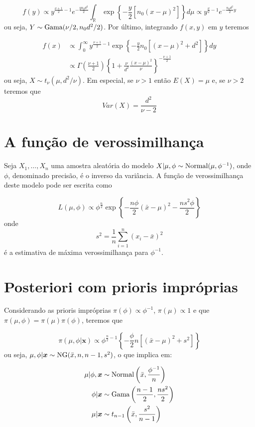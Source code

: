 \documentclass[
  letterpaper,
  DIV=11,
  numbers=noendperiod]{scrreprt}
\theoremstyle{definition}
\theoremstyle{definition}
\theoremstyle{remark}
\begin{document}
\[f(y)\propto y^{\frac{\nu+1}{2}-1}e^{-\frac{yn_0d^2}{2}}\int_{\mathbb{R}}\exp\left\{-\frac{y}{2}\left[n_0(x-\mu)^2\right]\right\}d\mu\propto y^{\frac{\nu}{2}-1}e^{-\frac{n_0d^2}{2}y}\]
ou seja, \(Y\sim\hbox{Gama}(\nu/2, n_0d^2/2)\). Por último, integrando
\(f(x,y)\) em \(y\) teremos

\[\begin{align}f(x)&\propto \int_0^\infty y^{\frac{\nu+1}{2}-1}\exp\left\{-\frac{y}{2}n_0\left[(x-\mu)^2 + d^2\right]\right\}dy \\&\propto \Gamma\left(\frac{\nu+1}{2}\right)\left\{1+\frac{\nu}{d^2}\frac{(x-\mu)^2}{\nu}\right\}^{-\frac{\nu+1}{2}}\end{align}\]
ou seja, \(X\sim t_{\nu}(\mu, d^2/\nu)\). Em especial, se \(\nu>1\)
então \(E(X)=\mu\) e, se \(\nu>2\) teremos que
\[Var(X)=\frac{d^2}{\nu-2}\]

\hypertarget{a-funuxe7uxe3o-de-verossimilhanuxe7a-1}{%
\section{A função de
verossimilhança}\label{a-funuxe7uxe3o-de-verossimilhanuxe7a-1}}

Seja \(X_1,\ldots,X_n\) uma amostra aleatória do modelo
\(X|\mu,\phi\sim\hbox{Normal}(\mu,\phi^{-1})\), onde \(\phi\),
denominado precisão, é o inverso da variância. A função de
verossimilhança deste modelo pode ser escrita como

\[L(\mu,\phi)\propto \phi^{\frac{n}{2}}\exp\left\{-\frac{n\phi}{2}(\bar{x}-\mu)^2 -\frac{ns^2\phi}{2}\right\}\]
onde \[s^2=\frac{1}{n}\sum_{i=1}^n(x_i-\bar{x})^2\] é a estimativa de
máxima verossimilhança para \(\phi^{-1}\).

\hypertarget{posteriori-com-prioris-impruxf3prias}{%
\section{Posteriori com prioris
impróprias}\label{posteriori-com-prioris-impruxf3prias}}

Considerando as prioris impróprias \(\pi(\phi)\propto \phi^{-1}\),
\(\pi(\mu)\propto 1\) e que \(\pi(\mu,\phi)=\pi(\mu)\pi(\phi)\), teremos
que

\[\pi(\mu,\phi|\boldsymbol{x})\propto \phi^{\frac{n}{2}-1}\left\{-\frac{\phi}{2}n\left[ (\bar{x}-\mu)^2 +s^2\right]\right\}\]
ou seja, \(\mu,\phi|\boldsymbol{x}\sim\hbox{NG}(\bar{x},n,n-1,s^2)\), o
que implica em:

\[\begin{align}
\mu|\phi,\boldsymbol{x}&\sim\hbox{Normal}\left(\bar{x},\frac{\phi^{-1}}{n}\right)\\
\phi|\boldsymbol{x}&\sim\hbox{Gama}\left(\frac{n-1}{2},\frac{ns^2}{2}\right)\\
\mu|\boldsymbol{x}&\sim t_{n-1}\left(\bar{x},\frac{s^2}{n-1}\right)
\end{align}\]
\end{document}
